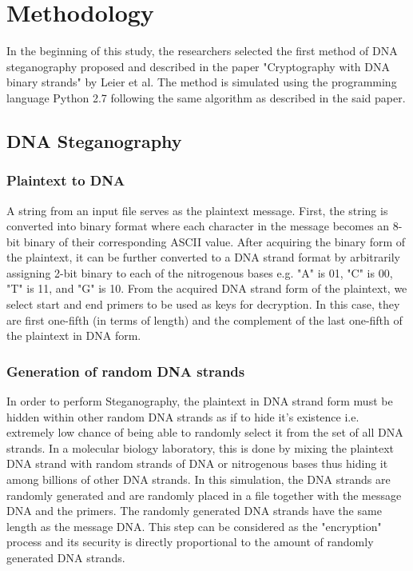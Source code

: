 \section{Methodology}
In the beginning of this study, the researchers selected the first method of DNA steganography proposed and described in the paper "Cryptography with DNA binary strands" by Leier et al\cite{leier}. The method is simulated using the programming language Python 2.7 following the same algorithm as described in the said paper.

\subsection{DNA Steganography}
\subsubsection{Plaintext to DNA}
A string from an input file serves as the plaintext message. First, the string is converted into binary format where each character in the message becomes an 8-bit binary of their corresponding ASCII value. After acquiring the binary form of the plaintext, it can be further converted to a DNA strand format by arbitrarily assigning 2-bit binary to each of the nitrogenous bases e.g. "A" is 01, "C" is 00, "T" is 11, and "G" is 10. From the acquired DNA strand form of the plaintext, we select start and end primers to be used as keys for decryption. In this case, they are first one-fifth (in terms of length) and the complement of the last one-fifth of the plaintext in DNA form.

\subsubsection{Generation of random DNA strands}
In order to perform Steganography, the plaintext in DNA strand form must be hidden within other random DNA strands as if to hide it's existence i.e. extremely low chance of being able to randomly select it from the set of all DNA strands. In a molecular biology laboratory, this is done by mixing the plaintext DNA strand with random strands of DNA or nitrogenous bases thus hiding it among billions of other DNA strands. In this simulation, the DNA strands are randomly generated and are randomly placed in a file together with the message DNA and the primers. The randomly generated DNA strands have the same length as the message DNA. This step can be considered as the "encryption" process and its security is directly proportional to the amount of randomly generated DNA strands.

